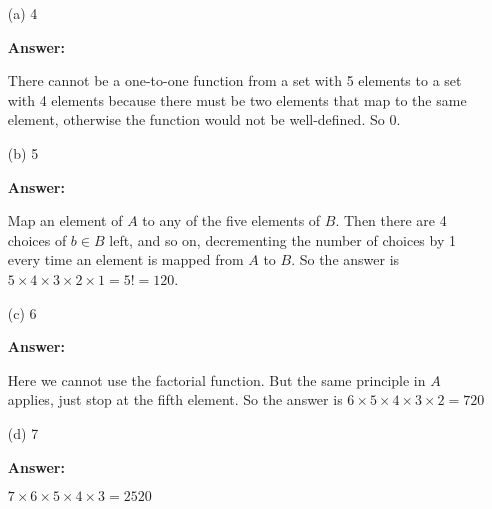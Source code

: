 \documentclass[14pt]{extreport}
\newcommand{\answer}[0]{\medskip \textbf{Answer:} \medskip}
\begin{document}
\begin{enumerate}
    
    \item[(a)] 4
    
        \answer

        There cannot be a one-to-one function from a set with 5 elements to a set with 4 elements because there must be two elements that map to the same element, otherwise the function would not be well-defined. So 0. 

    \item[(b)] 5
    
        \answer

        Map an element of \( A \) to any of the five elements of \( B \). Then there are 4 choices of \( b \in B \) left, and so on, decrementing the number of choices by 1 every time an element is mapped from \( A \) to \( B \). So the answer is \( 5 \times 4 \times 3 \times 2 \times 1 = 5! = 120 \).

    \item[(c)] 6
    
        \answer

        Here we cannot use the factorial function. But the same principle in \( A \) applies, just stop at the fifth element. So the answer is \( 6 \times 5 \times 4 \times 3 \times 2 = 720 \)

    \item[(d)] 7
    
        \answer

        \( 7 \times 6 \times 5 \times 4 \times 3 = 2520 \)

\end{enumerate}
\end{document}
